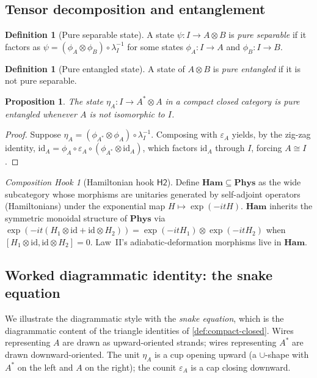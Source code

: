 \documentclass[12pt]{article}
\newtheorem{proposition}[theorem]{Proposition}
\theoremstyle{definition}
\newtheorem{definition}[theorem]{Definition}
\theoremstyle{remark}
\newtheorem{hook}[theorem]{Composition Hook}
\newcommand{\Phys}{\mathbf{Phys}}
\newcommand{\id}{\mathrm{id}}
\begin{document}
\subsection{Tensor decomposition and entanglement}

\begin{definition}[Pure separable state]
A state $\psi : I \to A \otimes B$ is \emph{pure separable} if it factors as $\psi = (\phi_A \otimes \phi_B) \circ \lambda_I^{-1}$ for some states $\phi_A : I \to A$ and $\phi_B : I \to B$.
\end{definition}

\begin{definition}[Pure entangled state]
A state of $A \otimes B$ is \emph{pure entangled} if it is not pure separable.
\end{definition}

\begin{proposition}
\label{prop:bell}
The state $\eta_A : I \to A^* \otimes A$ in a compact closed category is pure entangled whenever $A$ is not isomorphic to $I$.
\end{proposition}

\begin{proof}
Suppose $\eta_A = (\phi_{A^*} \otimes \phi_A) \circ \lambda_I^{-1}$. Composing with $\varepsilon_A$ yields, by the zig-zag identity, $\id_A = \phi_A \circ \varepsilon_A \circ (\phi_{A^*} \otimes \id_A)$, which factors $\id_A$ through $I$, forcing $A \cong I$.
\end{proof}

\begin{hook}[Hamiltonian hook $\mathsf{H2}$]
\label{hook:H2}
Define $\mathbf{Ham} \subseteq \Phys$ as the wide subcategory whose morphisms are unitaries generated by self-adjoint operators (Hamiltonians) under the exponential map $H \mapsto \exp(-i t H)$. $\mathbf{Ham}$ inherits the symmetric monoidal structure of $\Phys$ via $\exp(-i t (H_1 \otimes \id + \id \otimes H_2)) = \exp(-i t H_1) \otimes \exp(-i t H_2)$ when $[H_1 \otimes \id, \id \otimes H_2] = 0$. Law~II's adiabatic-deformation morphisms live in $\mathbf{Ham}$.
\end{hook}

\subsection{Worked diagrammatic identity: the snake equation}

We illustrate the diagrammatic style with the \emph{snake equation}, which is the diagrammatic content of the triangle identities of \cref{def:compact-closed}. Wires representing $A$ are drawn as upward-oriented strands; wires representing $A^*$ are drawn downward-oriented. The unit $\eta_A$ is a cup opening upward (a $\cup$-shape with $A^*$ on the left and $A$ on the right); the counit $\varepsilon_A$ is a cap closing downward.
\end{document}
